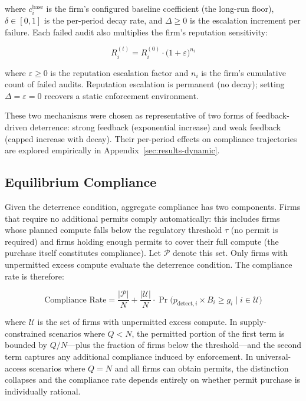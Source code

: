 where $c_i^{\mathrm{base}}$ is the firm's configured baseline coefficient (the long-run floor), $\delta \in [0,1]$ is the per-period decay rate, and $\Delta \geq 0$ is the escalation increment per failure. Each failed audit also multiplies the firm's reputation sensitivity:

\begin{equation}
R_i^{(t)} = R_i^{(0)} \cdot \bigl(1 + \varepsilon\bigr)^{n_i}
\label{eq:rep}
\end{equation}

where $\varepsilon \geq 0$ is the reputation escalation factor and $n_i$ is the firm's cumulative count of failed audits. Reputation escalation is permanent (no decay); setting $\Delta = \varepsilon = 0$ recovers a static enforcement environment.

These two mechanisms were chosen as representative of two forms of feedback-driven deterrence: strong feedback (exponential increase) and weak feedback (capped increase with decay). Their per-period effects on compliance trajectories are explored empirically in Appendix~\ref{sec:results-dynamic}.

\subsection{Equilibrium Compliance}

Given the deterrence condition, aggregate compliance has two components. Firms that require no additional permits comply automatically: this includes firms whose planned compute falls below the regulatory threshold $\tau$ (no permit is required) and firms holding enough permits to cover their full compute (the purchase itself constitutes compliance). Let $\mathcal{P}$ denote this set. Only firms with unpermitted excess compute evaluate the deterrence condition. The compliance rate is therefore:

\begin{equation}
\text{Compliance Rate} = \frac{|\mathcal{P}|}{N} + \frac{|\mathcal{U}|}{N} \cdot \Pr\!\big(p_{\mathrm{detect},i} \times B_i \geq g_i \;\big|\; i \in \mathcal{U}\big)
\end{equation}

where $\mathcal{U}$ is the set of firms with unpermitted excess compute. In supply-constrained scenarios where $Q < N$, the permitted portion of the first term is bounded by $Q/N$---plus the fraction of firms below the threshold---and the second term captures any additional compliance induced by enforcement. In universal-access scenarios where $Q = N$ and all firms can obtain permits, the distinction collapses and the compliance rate depends entirely on whether permit purchase is individually rational.

